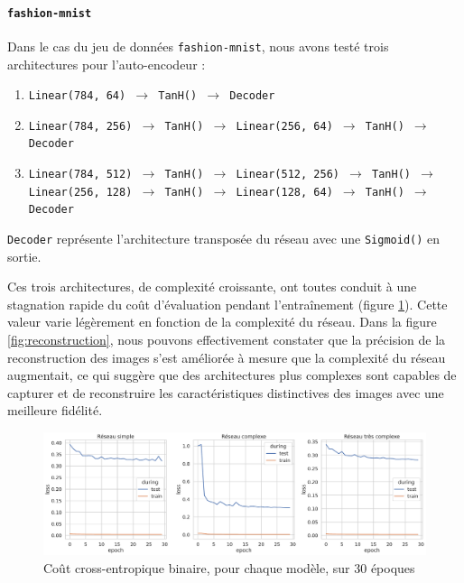 \documentclass{article}
\begin{document}
\paragraph*{\texttt{fashion-mnist}}

Dans le cas du jeu de données \texttt{fashion-mnist}, nous avons testé trois architectures pour l'auto-encodeur :

\begin{enumerate}
    \item \texttt{Linear(784, 64) $\rightarrow$ TanH() $\rightarrow$ Decoder}
    \item \texttt{Linear(784, 256) $\rightarrow$ TanH() $\rightarrow$ Linear(256, 64) $\rightarrow$ TanH() $\rightarrow$ Decoder}
    \item \texttt{Linear(784, 512) $\rightarrow$ TanH() $\rightarrow$ Linear(512, 256) $\rightarrow$ TanH() $\rightarrow$ Linear(256, 128) $\rightarrow$ TanH() $\rightarrow$ Linear(128, 64) $\rightarrow$ TanH() $\rightarrow$ Decoder}
\end{enumerate}

\texttt{Decoder} représente l'architecture transposée du réseau avec une \texttt{Sigmoid()} en sortie. 

Ces trois architectures, de complexité croissante, ont toutes conduit à une stagnation rapide du coût d'évaluation pendant l'entraînement (figure \ref{fig:lossencoder}). Cette valeur varie légèrement en fonction de la complexité du réseau. Dans la figure \ref{fig:reconstruction}, nous pouvons effectivement constater que la précision de la reconstruction des images s'est améliorée à mesure que la complexité du réseau augmentait, ce qui suggère que des architectures plus complexes sont capables de capturer et de reconstruire les caractéristiques distinctives des images avec une meilleure fidélité.

\begin{figure}[htbp]
    \centering
    \includegraphics*[width=.75\textwidth]{loss_encoder_fashion_3_networks.pdf}
    \caption{Coût cross-entropique binaire, pour chaque modèle, sur 30 époques}
    \label{fig:lossencoder}
\end{figure}
\end{document}

